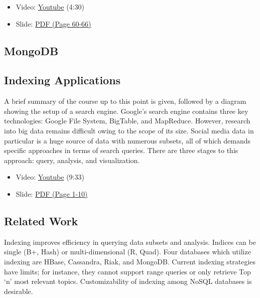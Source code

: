 \begin{itemize}

\item
  Video: \href{https://www.youtube.com/watch?v=KbFMpYRBTtU}{Youtube}
  (4:30)
\item
  Slide:
  \href{https://drive.google.com/open?id=0B88HKpainTSfaDFNbjNiMm44bnc}{PDF
  (Page 60-66)}
\end{itemize}

\subsection{MongoDB}


\subsection{Indexing Applications}\label{indexing-applications}

A brief summary of the course up to this point is given, followed by a
diagram showing the setup of a search engine. Google's search engine
contains three key technologies: Google File System, BigTable, and
MapReduce. However, research into big data remains difficult owing to
the scope of its size. Social media data in particular is a huge source
of data with numerous subsets, all of which demands specific approaches
in terms of search queries. There are three stages to this approach:
query, analysis, and visualization.

\begin{itemize}

\item
  Video: \href{https://www.youtube.com/watch?v=MxgabfoGH-M}{Youtube}
  (9:33)
\item
  Slide:
  \href{https://drive.google.com/open?id=0B88HKpainTSfWUh6dVNHcXloSnc}{PDF
  (Page 1-10)}
\end{itemize}

\subsection{Related Work}\label{related-work}

Indexing improves efficiency in querying data subsets and analysis.
Indices can be single (B+, Hash) or multi-dimensional (R, Quad). Four
databases which utilize indexing are HBase, Cassandra, Riak, and
MongoDB. Current indexing strategies have limits; for instance, they
cannot support range queries or only retrieve Top `n' most relevant
topics. Customizability of indexing among NoSQL databases is desirable.

